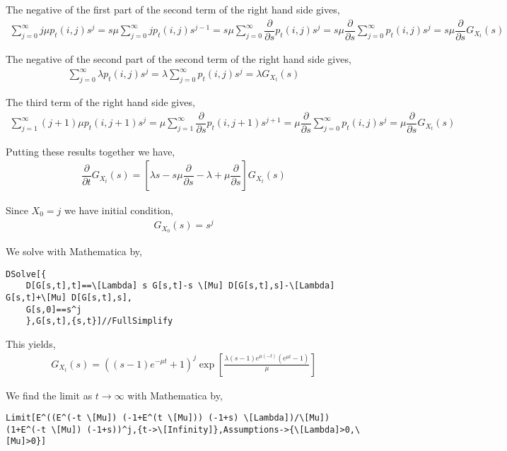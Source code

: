 \begin{solution}[Solution]
The negative of the first part of the second term of the right hand side gives,
\begin{align*}
    \sum_{j=0}^{\infty} j\mu p_t(i,j)s^j
    = s\mu  \sum_{j=0}^{\infty} j p_t(i,j)s^{j-1}
    = s\mu \sum_{j=0}^{\infty} \dfrac{\partial}{\partial s} p_t(i,j) s^{j}
    = s\mu \dfrac{\partial}{\partial s} \sum_{j=0}^{\infty} p_t(i,j) s^{j}
    = s\mu \dfrac{\partial}{\partial s} G_{X_t}(s)
\end{align*}

The negative of the second part of the second term of the right hand side gives,
\begin{align*}
    \sum_{j=0}^{\infty} \lambda p_t(i,j)s^{j}
    = \lambda \sum_{j=0}^{\infty} p_t(i,j) s^{j}
    = \lambda G_{X_t}(s)
\end{align*}

The third term of the right hand side gives,
\begin{align*}
    \sum_{j=1}^{\infty} (j+1)\mu p_t(i,j+1) s^{j}
    = \mu \sum_{j=1}^{\infty} \dfrac{\partial}{\partial s} p_t(i,j+1) s^{j+1} 
    = \mu \dfrac{\partial}{\partial s} \sum_{j=0}^{\infty} p_t(i,j)s^j
    = \mu \dfrac{\partial}{\partial s}G_{X_t}(s)
\end{align*}

Putting these results together we have,
\begin{align*}
    \dfrac{\partial}{\partial t} G_{X_t}(s)
    = \left[ \lambda s - s\mu \dfrac{\partial}{\partial s} - \lambda + \mu \dfrac{\partial}{\partial s} \right] G_{X_t}(s) 
\end{align*}

Since \( X_0 = j \) we have initial condition, 
\begin{align*}
    G_{X_0}(s) = s^j
\end{align*}

We solve with Mathematica by,
\begin{lstlisting}
DSolve[{
    D[G[s,t],t]==\[Lambda] s G[s,t]-s \[Mu] D[G[s,t],s]-\[Lambda] G[s,t]+\[Mu] D[G[s,t],s],
    G[s,0]==s^j
    },G[s,t],{s,t}]//FullSimplify
\end{lstlisting}

This yields,
\begin{align*}
    G_{X_t}(s) = \left((s-1) e^{-\mu t}+1\right)^j \exp \left[ \frac{\lambda  (s-1) e^{\mu  (-t)} \left(e^{\mu  t}-1\right)}{\mu } \right]
\end{align*}

We find the limit as \( t\to\infty \) with Mathematica by,
\begin{lstlisting}
Limit[E^((E^(-t \[Mu]) (-1+E^(t \[Mu])) (-1+s) \[Lambda])/\[Mu]) (1+E^(-t \[Mu]) (-1+s))^j,{t->\[Infinity]},Assumptions->{\[Lambda]>0,\[Mu]>0}]
\end{lstlisting}


\end{solution}
